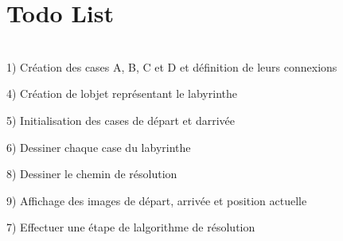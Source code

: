 \chapter{Todo List}
\hypertarget{todo}{}\label{todo}

\begin{DoxyRefList}
\item[Member \doxylink{prog_8cpp_aaf5e7f94cc186f55d373ad6a6d311bcb}{\+\_\+t\+Win\+Main} (HINSTANCE h\+Instance, HINSTANCE h\+Prev\+Instance, LPTSTR lp\+Cmd\+Line, int n\+Cmd\+Show)]\hfill \\
\label{todo__todo000001}%
%
1) Création des cases A, B, C et D et définition de leurs connexions 

\label{todo__todo000002}%
%
4) Création de l\textquotesingle{}objet  représentant le labyrinthe 

\label{todo__todo000003}%
%
5) Initialisation des cases de départ et d\textquotesingle{}arrivée 

\label{todo__todo000004}%
%
6) Dessiner chaque case du labyrinthe 

\label{todo__todo000005}%
%
8) Dessiner le chemin de résolution 

\label{todo__todo000006}%
%
9) Affichage des images de départ, arrivée et position actuelle 

\label{todo__todo000007}%
%
7) Effectuer une étape de l\textquotesingle{}algorithme de résolution 
\end{DoxyRefList}